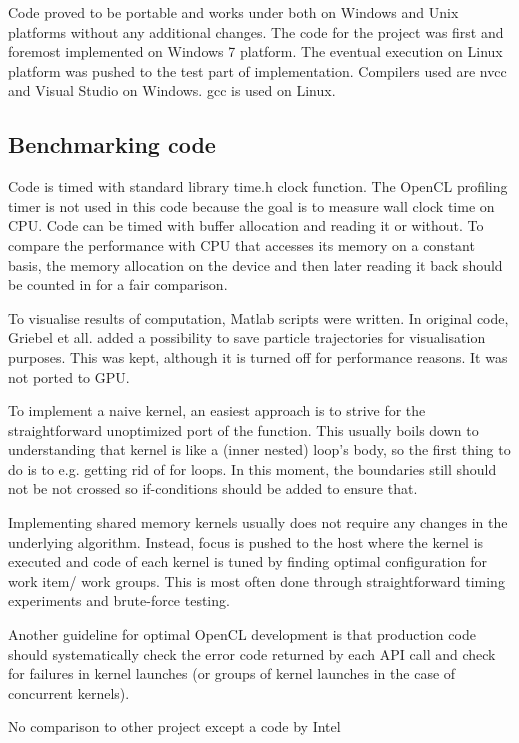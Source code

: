 Code proved to be portable and works under both on Windows and Unix platforms without any additional changes. The code for the project was first and foremost implemented on Windows 7 platform. The eventual execution on Linux platform was pushed to the test part of implementation. Compilers used are nvcc and Visual Studio on Windows. gcc is used on Linux.

\subsection{Benchmarking code}
Code is timed with standard library time.h clock function. The OpenCL profiling timer is not used in this code because the goal is to measure wall clock time on CPU. Code can be timed with buffer allocation and reading it or without. To compare the performance with CPU that accesses its memory on a constant basis, the memory allocation on the device and then later reading it back should be counted in for a fair comparison.

To visualise results of computation, Matlab scripts were written. In original code, Griebel et all. added a possibility to save particle trajectories for visualisation purposes. This was kept, although it is turned off for performance reasons. It was not ported to GPU.

To implement a naive kernel, an easiest approach is to strive for the straightforward unoptimized port of the function. This usually boils down to understanding that kernel is like a (inner nested) loop's body, so the first thing to do is to e.g. getting rid of for loops. In this moment, the boundaries still should not be not crossed so if-conditions should be added to ensure that.

Implementing shared memory kernels usually does not require any changes in the underlying algorithm. Instead, focus is pushed to the host where the kernel is executed and code of each kernel is tuned by finding optimal configuration for work item/ work groups. This is most often done through straightforward timing experiments and brute-force testing.

Another guideline for optimal OpenCL development is that production code should systematically check the error code returned by each API call and check for failures in kernel launches (or groups of kernel launches in the case of concurrent kernels). 

No comparison to other project except a code by Intel\cite{intel2012fluid}